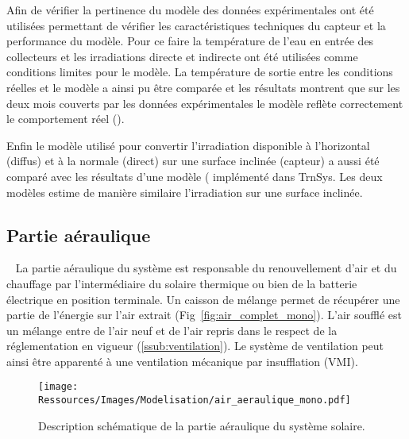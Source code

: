 Afin de vérifier la pertinence du modèle des données expérimentales ont été utilisées
permettant de vérifier les caractéristiques techniques du capteur et la performance du
modèle. Pour ce faire la température de l’eau en entrée des collecteurs et les
irradiations directe et indirecte ont été utilisées comme conditions limites pour le
modèle. La température de sortie entre les conditions réelles et le modèle a ainsi
pu être comparée et les résultats montrent que sur les deux mois couverts par les données
expérimentales le modèle reflète correctement le comportement réel ().

Enfin le modèle utilisé pour convertir l’irradiation disponible à l’horizontal (diffus)
et à la normale (direct) sur une surface inclinée (capteur) a aussi été comparé
avec les résultats d’une modèle ( implémenté dans TrnSys. Les deux
modèles estime de manière similaire l’irradiation sur une surface inclinée.



\subsection{Partie aéraulique} %
\label{sub:partie_aeraulique}
~
La partie aéraulique du système est responsable du renouvellement d’air et du chauffage
par l’intermédiaire du solaire thermique ou bien de la batterie électrique en
position terminale. Un caisson de mélange permet de récupérer une partie de l’énergie
sur l’air extrait (Fig~\ref{fig:air_complet_mono}). L’air soufflé est un mélange entre de l’air neuf et de l’air repris
dans le respect de la réglementation en vigueur (\ref{ssub:ventilation}).
Le système de ventilation peut ainsi être apparenté à une ventilation mécanique par insufflation
(VMI).

\begin{figure}
    \begin{center}
        \texttt{[image: Ressources/Images/Modelisation/air\_aeraulique\_mono.pdf]}
    \end{center}
    \caption{Description schématique de la partie aéraulique du système solaire.
             \label{fig:schema_aeraulique}}
\end{figure}


